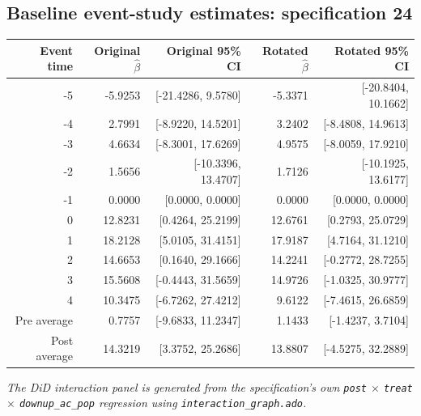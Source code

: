 \documentclass[10pt]{article}
\begin{document}
\subsection*{Baseline event-study estimates: specification 24}
\begin{center}
\scriptsize
\begin{tabular}{r rr rr}
\toprule
Event time & Original $\hat\beta$ & Original 95\% CI & Rotated $\hat\beta$ & Rotated 95\% CI \\
\midrule
-5 & -5.9253 & [-21.4286, 9.5780] & -5.3371 & [-20.8404, 10.1662] \\
-4 & 2.7991 & [-8.9220, 14.5201] & 3.2402 & [-8.4808, 14.9613] \\
-3 & 4.6634 & [-8.3001, 17.6269] & 4.9575 & [-8.0059, 17.9210] \\
-2 & 1.5656 & [-10.3396, 13.4707] & 1.7126 & [-10.1925, 13.6177] \\
-1 & 0.0000 & [0.0000, 0.0000] & 0.0000 & [0.0000, 0.0000] \\
0 & 12.8231 & [0.4264, 25.2199] & 12.6761 & [0.2793, 25.0729] \\
1 & 18.2128 & [5.0105, 31.4151] & 17.9187 & [4.7164, 31.1210] \\
2 & 14.6653 & [0.1640, 29.1666] & 14.2241 & [-0.2772, 28.7255] \\
3 & 15.5608 & [-0.4443, 31.5659] & 14.9726 & [-1.0325, 30.9777] \\
4 & 10.3475 & [-6.7262, 27.4212] & 9.6122 & [-7.4615, 26.6859] \\
\midrule
Pre average & 0.7757 & [-9.6833, 11.2347] & 1.1433 & [-1.4237, 3.7104] \\
Post average & 14.3219 & [3.3752, 25.2686] & 13.8807 & [-4.5275, 32.2889] \\
\bottomrule
\end{tabular}
\end{center}
\medskip
\textit{The DiD interaction panel is generated from the specification's own \texttt{post} $\times$ \texttt{treat} $\times$ \texttt{downup\_ac\_pop} regression using \texttt{interaction\_graph.ado}.}
\clearpage
\end{document}
